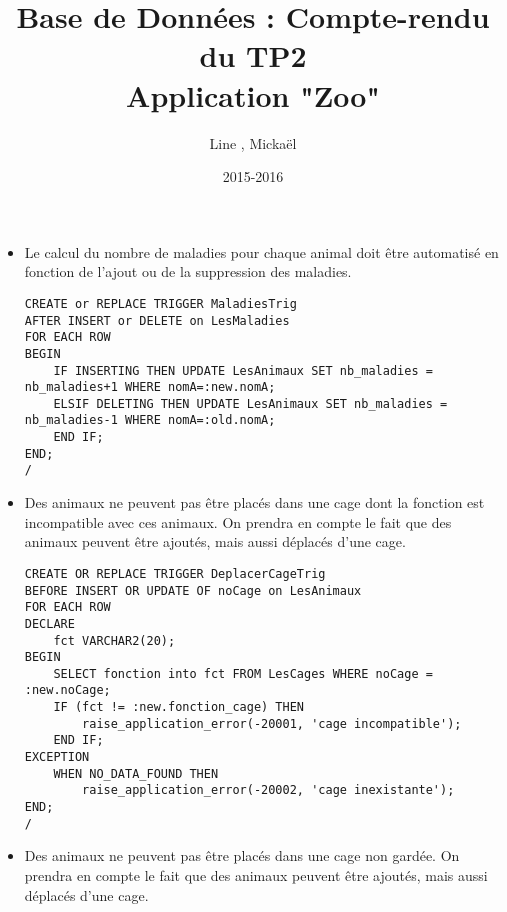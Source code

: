 \documentclass{article}
\title{Base de Données : Compte-rendu du TP2\\Application "Zoo"}
\author{Line \bsc{POUVARET}, Mickaël \bsc{TURNEL}}
\date{2015-2016}
\begin{document}
\maketitle

\begin{itemize}\renewcommand{\labelitemi}{$\bullet$}
	\item Le calcul du nombre de maladies pour chaque animal doit être automatisé en fonction de l’ajout
ou de la suppression des maladies.

\lstset{language=SQL}
\begin{lstlisting}
CREATE or REPLACE TRIGGER MaladiesTrig
AFTER INSERT or DELETE on LesMaladies
FOR EACH ROW
BEGIN
	IF INSERTING THEN UPDATE LesAnimaux SET nb_maladies = nb_maladies+1 WHERE nomA=:new.nomA;
	ELSIF DELETING THEN UPDATE LesAnimaux SET nb_maladies = nb_maladies-1 WHERE nomA=:old.nomA;
	END IF;
END;
/
\end{lstlisting}

	\item Des animaux ne peuvent pas être placés dans une cage dont la fonction est incompatible avec
ces animaux. On prendra en compte le fait que des animaux peuvent être ajoutés, mais aussi
déplacés d’une cage.\\

\begin{lstlisting}
CREATE OR REPLACE TRIGGER DeplacerCageTrig
BEFORE INSERT OR UPDATE OF noCage on LesAnimaux
FOR EACH ROW
DECLARE
	fct VARCHAR2(20);
BEGIN
	SELECT fonction into fct FROM LesCages WHERE noCage = :new.noCage;
	IF (fct != :new.fonction_cage) THEN
		raise_application_error(-20001, 'cage incompatible');
	END IF;
EXCEPTION 
	WHEN NO_DATA_FOUND THEN
		raise_application_error(-20002, 'cage inexistante');
END;
/
\end{lstlisting}
	\item Des animaux ne peuvent pas être placés dans une cage non gardée. On prendra en compte le
fait que des animaux peuvent être ajoutés, mais aussi déplacés d’une cage.


\end{itemize}
\end{document}
